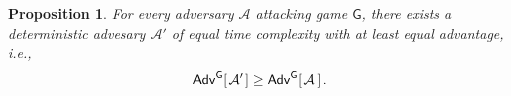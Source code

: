 \documentclass[psamsfonts, reqno]{amsart}
\newtheorem{prop}[thm]{Proposition}
\theoremstyle{definition}
\theoremstyle{remark}
\numberwithin{equation}{section}
\begin{document}
\begin{prop}\label{prop_deterministic_adversaries}
For every adversary $\mathcal{A}$ attacking
game $\mathsf{G}$,
there exists a deterministic advesary $\mathcal{A}'$
of equal time complexity with at least equal advantage, i.e.,
\vspace{0pt}
\begin{equation}\label{deterministic_bound}
\mathsf{Adv}
	^{\mathsf{G}}
	[
		\hspace{1pt}
		\mathcal{A}'
		\hspace{1pt}
	]
	\ge
	\mathsf{Adv}
		^{\mathsf{G}}
	[
		\hspace{1pt}
		\mathcal{A}
		\hspace{2pt}
	]\hspace{1pt}.
\vspace{5pt}
\end{equation}
\end{prop}
\end{document}
